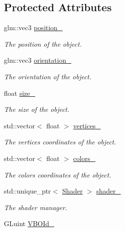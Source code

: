 \subsection*{Protected Attributes}
\begin{DoxyCompactItemize}
\item 
\hypertarget{classGraphicObject_a5bed301cfd29cea7e56e6e4b47c85c39}{}glm\+::vec3 \hyperlink{classGraphicObject_a5bed301cfd29cea7e56e6e4b47c85c39}{position\+\_\+}\label{classGraphicObject_a5bed301cfd29cea7e56e6e4b47c85c39}

\begin{DoxyCompactList}\small\item\em The position of the object. \end{DoxyCompactList}\item 
glm\+::vec3 \hyperlink{classGraphicObject_ad147f3d14ee99610b7ff2f6d50f601c9}{orientation\+\_\+}
\begin{DoxyCompactList}\small\item\em The orientation of the object. \end{DoxyCompactList}\item 
float \hyperlink{classGraphicObject_aaf5a021607b05779bd670fa912950bd1}{size\+\_\+}
\begin{DoxyCompactList}\small\item\em The size of the object. \end{DoxyCompactList}\item 
std\+::vector$<$ float $>$ \hyperlink{classGraphicObject_a911bfc9f48b22d0dbb3de68ff8a52ecf}{vertices\+\_\+}
\begin{DoxyCompactList}\small\item\em The vertices coordinates of the object. \end{DoxyCompactList}\item 
std\+::vector$<$ float $>$ \hyperlink{classGraphicObject_a58d16316152c9b216b0c258395f4ccb1}{colors\+\_\+}
\begin{DoxyCompactList}\small\item\em The colors coordinates of the object. \end{DoxyCompactList}\item 
std\+::unique\+\_\+ptr$<$ \hyperlink{classShader}{Shader} $>$ \hyperlink{classGraphicObject_a8ad07f4e11a71b5ed0d4fc66f14ab83e}{shader\+\_\+}
\begin{DoxyCompactList}\small\item\em The shader manager. \end{DoxyCompactList}\item 
\hypertarget{classGraphicObject_a8a25934d9b5af9b66ae731458a916db3}{}G\+Luint \hyperlink{classGraphicObject_a8a25934d9b5af9b66ae731458a916db3}{V\+B\+O\+Id\+\_\+}\label{classGraphicObject_a8a25934d9b5af9b66ae731458a916db3}


\end{DoxyCompactItemize}
